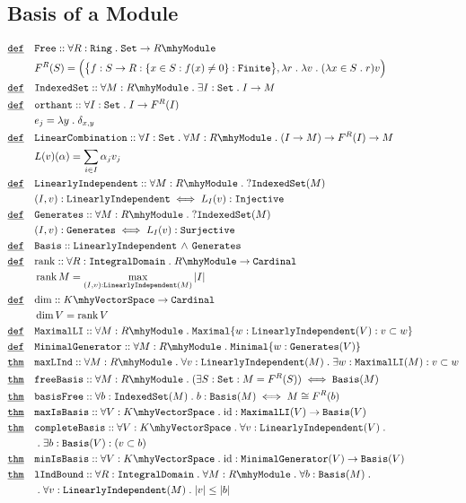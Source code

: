 \documentclass[12pt]{article}
\DeclareMathOperator*{\rk}{\mathrm{rank}}
\renewcommand{\.}{\; . \;}
\newcommand{\De}{\underline{\mathtt{def}} \quad}
\newcommand{\Thm}{\underline{\mathtt{thm}} \quad}
\newcommand{\module}[1]{{#1} \mhy \mathtt{Module}}
\newcommand{\ring}{\mathtt{Ring}}
\newcommand{\vs}[1]{#1 \mhy \mathtt{VectorSpace}}
\newcommand{\set}{\mathtt{Set}}
\newcommand{\fin}{\mathtt{Finite}}
\newcommand{\inj}{\mathtt{Injective}}
\newcommand{\surj}{\mathtt{Surjective}}
\newcommand{\is}{\mathtt{IndexedSet}}
\newcommand{\gen}{\mathtt{Generates}}
\newcommand{\basis}{\mathtt{Basis}}
\newcommand{\LInd}{\mathtt{LinearlyIndependent}}
\newcommand{\maxLInd}{\mathtt{MaximalLI}}
\newcommand{\minGen}{\mathtt{MinimalGenerator}}
\newcommand{\intD}{\mathtt{IntegralDomain}}
\newcommand{\card}{\mathtt{Cardinal}}
\begin{document}
\subsection{Basis of a Module}
\begin{align*}
\De &  \mathtt{Free} :: \forall R : \ring \. \set \to  \module{R}
\\  &  F^R(S) = \Big(  \big\{ f : S \to R : \{ x \in S : f(x) \neq 0 \} : \fin \big\}, 
		\lambda r  \. \lambda v \. (\lambda x \in S \. r)v \Big) \\
\De &   \is :: \forall M : \module{R} \. \exists I : \set \. I \to M \\
\De &   \mathtt{orthant} :: \forall I : \set \. I \to F^R(I) \\
	&   e_j = \lambda y \. \delta_{x,y} \\
\De &   \mathtt{LinearCombination} :: \forall I : \set \. \forall M : \module{R} \. 
		(I \to M) \to  F^R(I) \to M \\
	& L(v)(\alpha) = \sum_{i \in I} \alpha_jv_j \\
\De & \LInd :: \forall M : \module{R} \. ?\is(M) \\
	& (I,v) : \LInd \iff L_I(v) : \inj \\
\De & \gen :: \forall M : \module{R} \. ?\is(M) \\
	& (I,v) : \gen \iff L_I(v) : \surj \\
\De & \basis :: \LInd \, \wedge \, \gen \\
\De &  {\rk} :: \forall R : \intD \. \module{R} \to \card \\
    & \rk M = \max_{(I,v) : \LInd(M)} |I| \\    
\De &  {\dim} :: \vs{K} \to \card \\
    & \dim V = \rk V  \\
\De & \maxLInd :: \forall M : \module{R} \. \mathtt{Maximal} \{ w : \LInd(V) : v \subset w \} \\
\De & \minGen :: \forall M : \module{R} \. \mathtt{Minimal} \{ w : \gen(V)  \} \\
\Thm & \mathtt{maxLInd} :: \forall M : \module{R} \. \forall v : \LInd(M) \. 
	\exists  w : \maxLInd(M) : v \subset w \\
\Thm & \mathtt{freeBasis} :: \forall M : \module{R} \. ( \exists S : \set : M = F^R(S)) \iff
	\basis(M) \\
\Thm & \mathtt{basisFree} ::  \forall b : \is(M) \. b : \basis(M) \iff M \cong F^R(b) \\
\Thm & \mathtt{maxIsBasis} ::  \forall V : \vs{K}  \.\mathrm{id} :  \maxLInd(V) \to \basis(V) \\
\Thm & \mathtt{completeBasis} :: \forall V : \vs{K} \. \forall v : \LInd(V) \. \\ 
	 & 	\. \exists b : \basis(V)  : ( v \subset b) \\
\Thm & \mathtt{minIsBasis}  :: \forall V : \vs{K}  \. \mathrm{id} :  \minGen(V)  \to \basis(V) \\
\Thm & \mathtt{lIndBound}  :: \forall R : \intD \. \forall M : \module{R}  \. \forall b : \basis(M)
	\. \\ &	\. \forall v : \LInd(M) \. |v| \le |b|
\end{align*}
\end{document}

